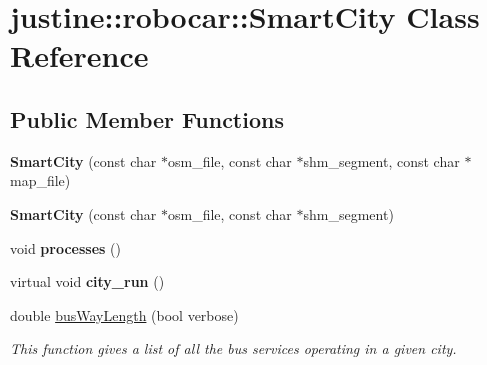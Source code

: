 \hypertarget{classjustine_1_1robocar_1_1SmartCity}{\section{justine\-:\-:robocar\-:\-:Smart\-City Class Reference}
\label{classjustine_1_1robocar_1_1SmartCity}
}
\subsection*{Public Member Functions}
\begin{DoxyCompactItemize}
\item 
\hypertarget{classjustine_1_1robocar_1_1SmartCity_aa9fee6663f3108a6f42171d011c7738d}{{\bfseries Smart\-City} (const char $\ast$osm\-\_\-file, const char $\ast$shm\-\_\-segment, const char $\ast$map\-\_\-file)}\label{classjustine_1_1robocar_1_1SmartCity_aa9fee6663f3108a6f42171d011c7738d}

\item 
\hypertarget{classjustine_1_1robocar_1_1SmartCity_a11a42f551adb2f030dcd788b1da210aa}{{\bfseries Smart\-City} (const char $\ast$osm\-\_\-file, const char $\ast$shm\-\_\-segment)}\label{classjustine_1_1robocar_1_1SmartCity_a11a42f551adb2f030dcd788b1da210aa}

\item 
\hypertarget{classjustine_1_1robocar_1_1SmartCity_a441ebb06a391b9c0409eb68751b15f43}{void {\bfseries processes} ()}\label{classjustine_1_1robocar_1_1SmartCity_a441ebb06a391b9c0409eb68751b15f43}

\item 
\hypertarget{classjustine_1_1robocar_1_1SmartCity_acafc9d2d447431798e32d1a652b2fe13}{virtual void {\bfseries city\-\_\-run} ()}\label{classjustine_1_1robocar_1_1SmartCity_acafc9d2d447431798e32d1a652b2fe13}

\item 
\hypertarget{classjustine_1_1robocar_1_1SmartCity_ad296267bfa7809696019064ed4a51432}{double \hyperlink{classjustine_1_1robocar_1_1SmartCity_ad296267bfa7809696019064ed4a51432}{bus\-Way\-Length} (bool verbose)}\label{classjustine_1_1robocar_1_1SmartCity_ad296267bfa7809696019064ed4a51432}

\begin{DoxyCompactList}\small\item\em This function gives a list of all the bus services operating in a given city. \end{DoxyCompactList}\end{DoxyCompactItemize}
